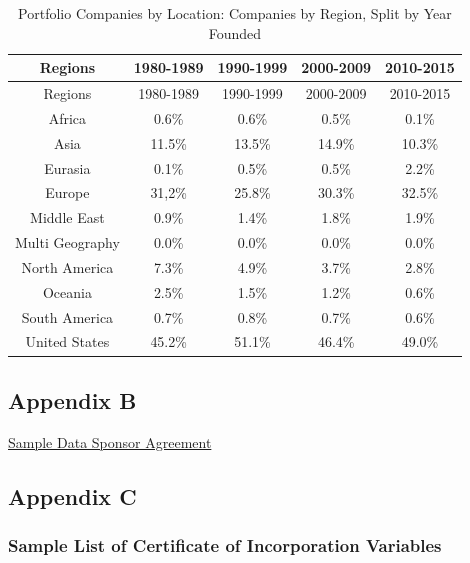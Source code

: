 \documentclass[
]{book}
\begin{document}
\begin{longtable}[]{@{}ccccc@{}}
\caption{\label{tab:pcritablea3} Portfolio Companies by Location: Companies by Region, Split by Year Founded}\tabularnewline
\toprule
Regions & 1980-1989 & 1990-1999 & 2000-2009 & 2010-2015\tabularnewline
\midrule
\endfirsthead
\toprule
Regions & 1980-1989 & 1990-1999 & 2000-2009 & 2010-2015\tabularnewline
\midrule
\endhead
Africa & 0.6\% & 0.6\% & 0.5\% & 0.1\%\tabularnewline
Asia & 11.5\% & 13.5\% & 14.9\% & 10.3\%\tabularnewline
Eurasia & 0.1\% & 0.5\% & 0.5\% & 2.2\%\tabularnewline
Europe & 31,2\% & 25.8\% & 30.3\% & 32.5\%\tabularnewline
Middle East & 0.9\% & 1.4\% & 1.8\% & 1.9\%\tabularnewline
Multi Geography & 0.0\% & 0.0\% & 0.0\% & 0.0\%\tabularnewline
North America & 7.3\% & 4.9\% & 3.7\% & 2.8\%\tabularnewline
Oceania & 2.5\% & 1.5\% & 1.2\% & 0.6\%\tabularnewline
South America & 0.7\% & 0.8\% & 0.7\% & 0.6\%\tabularnewline
United States & 45.2\% & 51.1\% & 46.4\% & 49.0\%\tabularnewline
\bottomrule
\end{longtable}

\hypertarget{appendix-b-1}{%
\subsection*{Appendix B}\label{appendix-b-1}}

\href{./appendix/pcri_appendix_b.pdf}{Sample Data Sponsor Agreement}

\hypertarget{appendix-c}{%
\subsection*{Appendix C}\label{appendix-c}}

\hypertarget{sample-list-of-certificate-of-incorporation-variables}{%
\subsubsection*{Sample List of Certificate of Incorporation Variables}\label{sample-list-of-certificate-of-incorporation-variables}}
\end{document}
